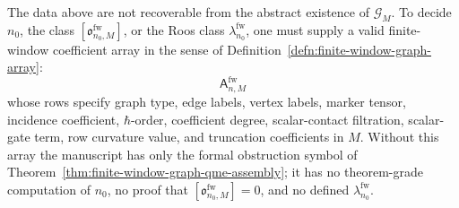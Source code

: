 \begin{thm}
  The data above are not recoverable from the abstract existence of
  \(\mathcal G_M\).  To decide \(n_0\), the class
  \([\mathfrak o^{\mathrm{fw}}_{n_0,M}]\), or the Roos class
  \(\lambda^{\mathrm{fw}}_{n_0}\), one must supply a valid finite-window
  coefficient array in the sense of
  Definition~\ref{defn:finite-window-graph-array}:
  \[
    \mathsf A^{\mathrm{fw}}_{n,M}
  \]
  whose rows specify graph type, edge labels, vertex labels, marker tensor,
  incidence coefficient, \(\hbar\)-order, coefficient degree,
  scalar-contact filtration, scalar-gate term, row curvature value, and
  truncation coefficients in \(M\).  Without this array the manuscript has
  only the formal obstruction symbol of
  Theorem~\ref{thm:finite-window-graph-qme-assembly}; it has no
  theorem-grade computation of \(n_0\), no proof that
  \([\mathfrak o^{\mathrm{fw}}_{n_0,M}]=0\), and no defined
  \(\lambda^{\mathrm{fw}}_{n_0}\).
\end{thm}

